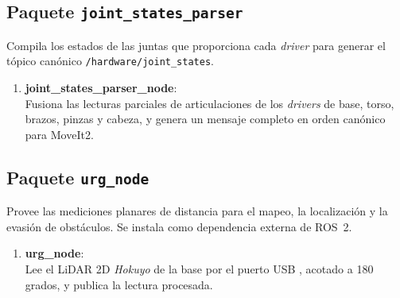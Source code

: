 \subsection{Paquete \texttt{joint\_states\_parser}}

Compila los estados de las juntas que proporciona cada \textit{driver} para generar el tópico canónico \texttt{/hardware/joint\_states}.

\begin{enumerate}

\item \textbf{joint\_states\_parser\_node}: \\
Fusiona las lecturas parciales de articulaciones de los \textit{drivers} de base, torso, brazos, pinzas y cabeza, y genera un mensaje completo en orden canónico para MoveIt2.

\end{enumerate}

\subsection{Paquete \texttt{urg\_node}}

Provee las mediciones planares de distancia para el mapeo, la localización y la evasión de obstáculos. Se instala como dependencia externa de ROS~2.

\begin{enumerate}

\item \textbf{urg\_node}: \\
Lee el LiDAR 2D \emph{Hokuyo} de la base por el puerto USB , acotado a 180 grados, y publica la lectura procesada.

\end{enumerate}
